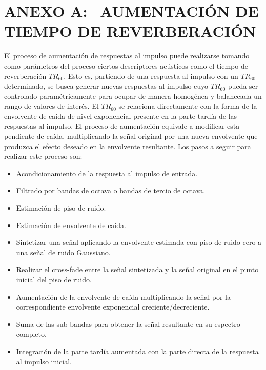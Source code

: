 \section[Aumentación de tiempo de reverberación]{ANEXO A:$\ \ \ \ $AUMENTACIÓN DE TIEMPO DE REVERBERACIÓN}

El proceso de aumentación de respuestas al impulso puede realizarse tomando como parámetros del proceso ciertos descriptores acústicos como el tiempo de reverberación $TR_{60}$. Esto es, partiendo de una respuesta al impulso con un $TR_{60}$ determinado, se busca generar nuevas respuestas al impulso cuyo $TR_{60}$ pueda ser controlado paramétricamente para ocupar de manera homogénea y balanceada un rango de valores de interés. 
El $TR_{60}$ se relaciona directamente con la forma de la envolvente de caída de nivel exponencial presente en la parte tardía de las respuestas al impulso. El proceso de aumentación equivale a modificar esta pendiente de caída, multiplicando la señal original por una nueva envolvente que produzca el efecto deseado en la envolvente resultante. Los pasos a seguir para realizar este proceso son: 

\begin{itemize}
  \item Acondicionamiento de la respuesta al impulso de entrada.
  \item Filtrado por bandas de octava o bandas de tercio de octava.
  \item Estimación de piso de ruido.
  \item Estimación de envolvente de caída.
  \item Sintetizar una señal aplicando la envolvente estimada con piso de ruido cero a una señal de ruido Gaussiano. 
  \item Realizar el cross-fade entre la señal sintetizada y la señal original en el punto inicial del piso de ruido.
  \item Aumentación de la envolvente de caída multiplicando la señal por la correspondiente envolvente exponencial creciente/decreciente.
  \item Suma de las sub-bandas para obtener la señal resultante en su espectro completo.
  \item Integración de la parte tardía aumentada con la parte directa de la respuesta al impulso inicial.
\end{itemize} 	

